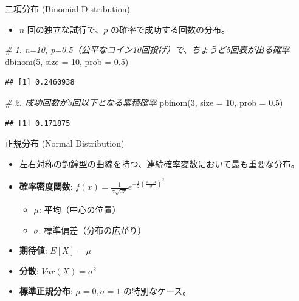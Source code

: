 \documentclass[
  ignorenonframetext,
]{beamer}
\newenvironment{Shaded}{\begin{snugshade}}{\end{snugshade}}
\newcommand{\AttributeTok}[1]{\textcolor[rgb]{0.77,0.63,0.00}{#1}}
\newcommand{\CommentTok}[1]{\textcolor[rgb]{0.56,0.35,0.01}{\textit{#1}}}
\newcommand{\DecValTok}[1]{\textcolor[rgb]{0.00,0.00,0.81}{#1}}
\newcommand{\FloatTok}[1]{\textcolor[rgb]{0.00,0.00,0.81}{#1}}
\newcommand{\FunctionTok}[1]{\textcolor[rgb]{0.00,0.00,0.00}{#1}}
\newcommand{\NormalTok}[1]{#1}
\providecommand{\tightlist}{%
  \setlength{\itemsep}{0pt}\setlength{\parskip}{0pt}}
\begin{document}
\begin{frame}[fragile]{二項分布 (Binomial Distribution)}
\protect\hypertarget{ux4e8cux9805ux5206ux5e03-binomial-distribution-1}{}
\begin{itemize}
\tightlist
\item
  \(n\) 回の独立な試行で、\(p\) の確率で成功する回数の分布。
\end{itemize}

\scriptsize

\begin{Shaded}
\begin{Highlighting}[]
\CommentTok{\# 1. n=10, p=0.5（公平なコイン10回投げ）で、ちょうど5回表が出る確率}
\FunctionTok{dbinom}\NormalTok{(}\DecValTok{5}\NormalTok{, }\AttributeTok{size =} \DecValTok{10}\NormalTok{, }\AttributeTok{prob =} \FloatTok{0.5}\NormalTok{)}
\end{Highlighting}
\end{Shaded}

\begin{verbatim}
## [1] 0.2460938
\end{verbatim}

\begin{Shaded}
\begin{Highlighting}[]
\CommentTok{\# 2. 成功回数が3回以下となる累積確率}
\FunctionTok{pbinom}\NormalTok{(}\DecValTok{3}\NormalTok{, }\AttributeTok{size =} \DecValTok{10}\NormalTok{, }\AttributeTok{prob =} \FloatTok{0.5}\NormalTok{)}
\end{Highlighting}
\end{Shaded}

\begin{verbatim}
## [1] 0.171875
\end{verbatim}

\normalsize
\end{frame}

\begin{frame}{正規分布 (Normal Distribution)}
\protect\hypertarget{ux6b63ux898fux5206ux5e03-normal-distribution}{}
\begin{itemize}
\tightlist
\item
  左右対称の釣鐘型の曲線を持つ、連続確率変数において最も重要な分布。
\item
  \textbf{確率密度関数}:
  \(f(x) = \frac{1}{\sigma\sqrt{2\pi}} e^{-\frac{1}{2}\left(\frac{x-\mu}{\sigma}\right)^2}\)

  \begin{itemize}
  \tightlist
  \item
    \(\mu\): 平均（中心の位置）
  \item
    \(\sigma\): 標準偏差（分布の広がり）
  \end{itemize}
\item
  \textbf{期待値}: \(E[X] = \mu\)
\item
  \textbf{分散}: \(Var(X) = \sigma^2\)
\item
  \textbf{標準正規分布}: \(\mu=0, \sigma=1\) の特別なケース。
\end{itemize}
\end{frame}
\end{document}
